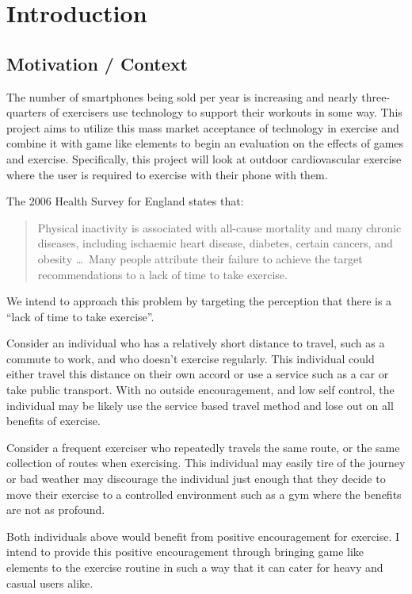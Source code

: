 \chapter{Introduction}\label{ch_intro}

\section{Motivation / Context}
The number of smartphones being sold per year is
increasing\cite{phones_gartner, phones_guardian} and nearly
three-quarters of exercisers use technology to support their
workouts in some way\cite{lifefitness}. This project aims to utilize this mass market
acceptance of technology in exercise and combine it with game like
elements to begin an evaluation on the effects of games and
exercise. Specifically, this project will look at outdoor
cardiovascular exercise where the user is required to exercise with
their phone with them.

The 2006 Health Survey for England\cite{exercise} states that: 
\begin{quote}
  Physical inactivity is associated with all-cause mortality and
  many chronic diseases, including ischaemic heart disease, diabetes,
  certain cancers, and obesity \dots \ Many people attribute their
  failure to achieve the target recommendations to a lack of time to
  take exercise. 
\end{quote} 
We intend to approach this problem by targeting the perception that
there is a ``lack of time to take exercise''. 


Consider an individual who has a relatively short distance to travel,
such as a commute to work,
and who doesn't exercise regularly. This individual could either
travel this distance on their own accord or use a service such as a
car or take public transport. With no outside encouragement, and low
self control, the individual may be likely use the service based
travel method and lose out on all benefits of exercise. 

Consider a frequent exerciser who repeatedly travels the same route,
or the same collection of routes when exercising. This individual may
easily tire of the journey or bad weather may discourage the
individual just enough that they decide to move their exercise to a
controlled environment such as a gym where the benefits are not as profound.

Both individuals above would benefit from positive encouragement for
exercise. I intend to provide this positive encouragement through
bringing game like elements to the exercise routine in such a way that
it can cater for heavy and casual users alike.

